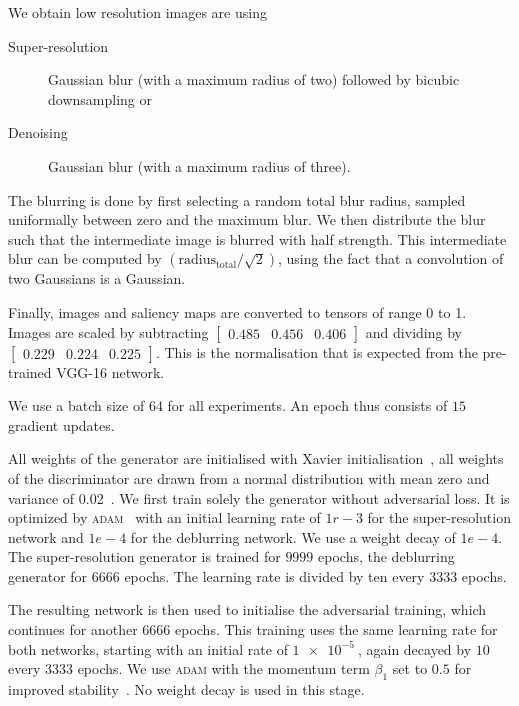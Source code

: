 \documentclass{scrartcl}
\begin{document}
We obtain low resolution images are using
\begin{description}
\item[Super-resolution] Gaussian blur (with a maximum radius of two) followed by bicubic downsampling or
\item[Denoising] Gaussian blur (with a maximum radius of three).
\end{description}
The blurring is done by first selecting a random total blur radius, sampled uniformally between zero and the maximum blur.
We then distribute the blur such that the intermediate image is blurred with half strength.
This intermediate blur can be computed by \( \left( \text{radius}_{\text{total}} / \sqrt{2} \right)\), using the fact that a convolution of two Gaussians is a Gaussian.

Finally, images and saliency maps are converted to tensors of range 0 to 1.
Images are scaled by subtracting
\(
\begin{bmatrix}
 0.485 & 0.456 & 0.406 
\end{bmatrix}
\)
and dividing by
\(
\begin{bmatrix}
0.229 & 0.224& 0.225
\end{bmatrix}
\).
This is the normalisation that is expected from the pre-trained VGG-16 network.

We use a batch size of $64$ for all experiments.
An epoch thus consists of $15$ gradient updates.

All weights of the generator are initialised with Xavier initialisation~\cite{Xavier}, all weights of the discriminator are drawn from a normal distribution with mean zero and variance of 0.02~\cite{PatchGAN}. 
We first train solely the generator without adversarial loss.
It is optimized by \textsc{adam}~\cite{Adam} with an initial learning rate of $1r-3$ for the super-resolution network and $1e-4$ for the deblurring network.
We use a weight decay of $1e-4$.
The super-resolution generator is trained for $9999$ epochs, the deblurring generator for $6666$ epochs.
The learning rate is divided by ten every $3333$ epochs.

The resulting network is then used to initialise the adversarial training, which continues for another $6666$ epochs.
This training uses the same learning rate for both networks, starting with an initial rate of $\SI{1e-5}{}$, again decayed by $10$ every $3333$ epochs.
We use \textsc{adam} with the momentum term $\beta_1$ set to $0.5$ for improved stability~\cite{Dcgan}.
No weight decay is used in this stage.
\end{document}
